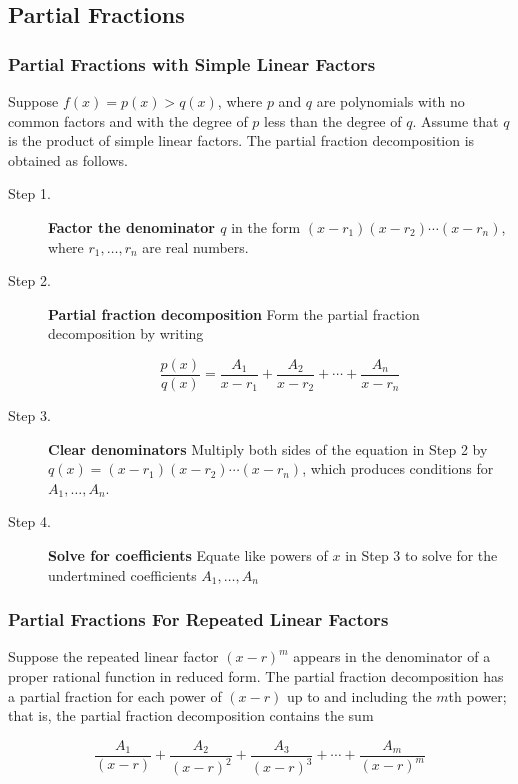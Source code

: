 \subsection{Partial Fractions}
\subsubsection{Partial Fractions with Simple Linear Factors}
Suppose $f(x) = p(x) > q(x)$, where $p$ and $q$ are polynomials with no common factors and with the degree of $p$ less than the degree of $q$. Assume that $q$ is the product of simple linear factors. The partial fraction decomposition is obtained as follows.

\begin{description}
\item [Step 1.] \textbf{Factor the denominator $q$} in the form $(x - r_1)(x - r_2)\cdots(x - r_n)$, where $r_1,\ldots,r_n$ are real numbers.
\item [Step 2.] \textbf{Partial fraction decomposition} Form the partial fraction decomposition by writing

\begin{equation}
    \frac{p(x)}{q(x)} = \frac{A_1}{x - r_1} + \frac{A_2}{x - r_2} + \cdots + \frac{A_n}{x - r_n}
\end{equation}

\item [Step 3.] \textbf{Clear denominators} Multiply both sides of the equation in Step 2 by $q(x) = (x - r_1)(x - r_2)\cdots(x-r_n)$, which produces conditions for $A_1,\ldots,A_n$.

\item [Step 4.] \textbf{Solve for coefficients} Equate like powers of $x$ in Step 3 to solve for the undertmined coefficients $A_1,\ldots,A_n$
\end{description}

\subsubsection{Partial Fractions For Repeated Linear Factors}
Suppose the repeated linear factor $(x - r)^m$ appears in the denominator of a proper rational function in reduced form. The partial fraction decomposition has a partial fraction for each power of $(x - r)$ up to and including the $m$th power; that is, the partial fraction decomposition contains the sum

\begin{equation}
    \frac{A_1}{(x - r)} + \frac{A_2}{(x - r)^2} + \frac{A_3}{(x - r)^3} + \cdots + \frac{A_m}{(x - r)^m}
\end{equation}


